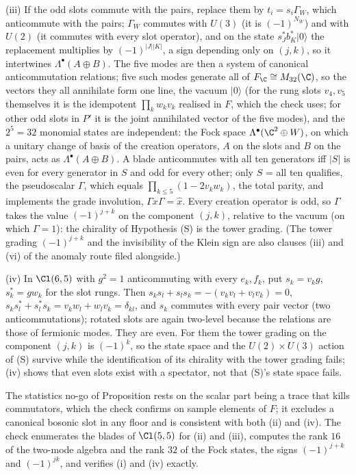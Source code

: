 (iii) If the odd slots commute with the pairs, replace them by $t_{i} = s_{i}\Gamma_{W}$, which anticommute with the pairs; $\Gamma_{W}$ commutes with $U(3)$ (it is $(-1)^{N_{W}}$) and with $U(2)$ (it commutes with every slot operator), and on the state $s_{J}^{*}b_{K}^{*}\lvert 0\rangle$ the replacement multiplies by $(-1)^{|J||K|}$, a sign depending only on $(j, k)$, so it intertwines $\Lambda^{\bullet}(A \oplus B)$. The five modes are then a system of canonical anticommutation relations; five such modes generate all of $F_{\C} \cong M_{32}(\C)$, so the vectors they all annihilate form one line, the vacuum $\lvert 0\rangle$ (for the rung slots $v_{4}, v_{5}$ themselves it is the idempotent $\prod_{k}w_{k}v_{k}$ realised in $F$, which the check uses; for other odd slots in $P'$ it is the joint annihilated vector of the five modes), and the $2^{5} = 32$ monomial states are independent: the Fock space $\Lambda^{\bullet}(\C^{2} \oplus W)$, on which a unitary change of basis of the creation operators, $A$ on the slots and $B$ on the pairs, acts as $\Lambda^{\bullet}(A \oplus B)$. A blade anticommutes with all ten generators iff $|S|$ is even for every generator in $S$ and odd for every other; only $S$ = all ten qualifies, the pseudoscalar $\Gamma$, which equals $\prod_{k \le 5}(1 - 2v_{k}w_{k})$, the total parity, and implements the grade involution, $\Gamma x \Gamma = \hat{x}$. Every creation operator is odd, so $\Gamma$ takes the value $(-1)^{j + k}$ on the component $(j, k)$, relative to the vacuum (on which $\Gamma = 1$): the chirality of Hypothesis (S) is the tower grading. (The tower grading $(-1)^{j+k}$ and the invisibility of the Klein sign are also clauses (iii) and (vi) of the anomaly route filed alongside.)

(iv) In $\Cl(6,5)$ with $g^{2} = 1$ anticommuting with every $e_{k}, f_{k}$, put $s_{k} = v_{k}g$, $s_{k}^{*} = g w_{k}$ for the slot rungs. Then $s_{k}s_{l} + s_{l}s_{k} = -(v_{k}v_{l} + v_{l}v_{k}) = 0$, $s_{k}s_{l}^{*} + s_{l}^{*}s_{k} = v_{k}w_{l} + w_{l}v_{k} = \delta_{kl}$, and $s_{k}$ commutes with every pair vector (two anticommutations); rotated slots are again two-level because the relations are those of fermionic modes. They are even. For them the tower grading on the component $(j, k)$ is $(-1)^{k}$, so the state space and the $U(2) \times U(3)$ action of (S) survive while the identification of its chirality with the tower grading fails; (iv) shows that even slots exist with a spectator, not that (S)'s state space fails.

The statistics no-go of Proposition  rests on the scalar part being a trace that kills commutators, which the check confirms on sample elements of $F$; it excludes a canonical bosonic slot in any floor and is consistent with both (ii) and (iv). The check enumerates the blades of $\Cl(5,5)$ for (ii) and (iii), computes the rank $16$ of the two-mode algebra and the rank $32$ of the Fock states, the signs $(-1)^{j+k}$ and $(-1)^{jk}$, and verifies (i) and (iv) exactly.
